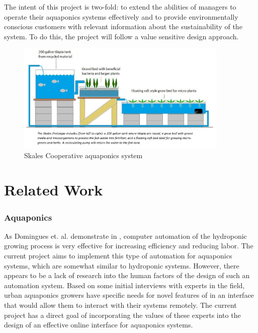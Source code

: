 \documentclass{sigchi}
\begin{document}
The intent of this project is two-fold: to extend the abilities of managers to operate their aquaponics systems effectively and to provide environmentally conscious customers with relevant information about the sustainability of the system. To do this, the project will follow a value sensitive design approach.

\begin{figure}
\centering
\includegraphics[width=0.9\textwidth]{systemDiagram}
\caption{Skales Cooperative aquaponics system}
\label{fig:skales}
\end{figure}

\section{Related Work}
\subsubsection{Aquaponics}

As Domingues et. al. demonstrate in \cite{automated}, computer automation of the hydroponic growing process is very effective for increasing efficiency and reducing labor. The current project aims to implement this type of automation for aquaponics systems, which are somewhat similar to hydroponic systems. However, there appears to be a lack of research into the human factors of the design of such an automation system. Based on some initial interviews with experts in the field, urban aquaponics growers have specific needs for novel features of in an interface that would allow them to interact with their systems remotely. The current project has a direct goal of incorporating the values of these experts into the design of an effective online interface for aquaponics systems. 
\end{document}
